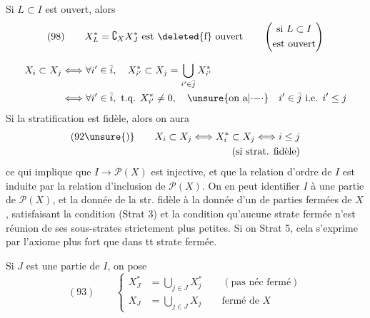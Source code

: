Si  $L\subset I$ est ouvert,  alors
\[
(98)\qquad X_L^*=\complement_X X_J^*\text{ est }\text{\deleted{f}}\text{ ouvert}\qquad\left(\begin{gathered}\text{si }L\subset I\\\text{est ouvert}\end{gathered}\right)
\]


\[
\begin{aligned}
X_i\subset X_j&\Longleftrightarrow\forall i'\in\bar i,\quad X_{i'}^*\subset X_j=\bigcup_{i'\in\bar j}X_{i'}^*\\
&\Longleftrightarrow\forall i'\in\bar i,\text{ t.q. }X_{i'}^*\neq0,\quad\unsure{\text{on a}|\mathord{\cdot}\mathord{-}\mathord{\cdot}}\quad i'\in\bar j\text{ i.e. }i'\leq j
\end{aligned}
\]
Si la stratification est fidèle, alors on aura 
\[
\begin{aligned}
(92\unsure{)}\qquad X_i\subset X_j\Longleftrightarrow X_i^*\subset X_j\Longleftrightarrow i\leq j&\\
(\text{si strat. fidèle})&
\end{aligned}
\]
ce qui implique que $I\longrightarrow\mathcal P(X)$ est injective, et que la relation d'ordre de $I$ est induite par la relation d'inclusion de $\mathcal P(X)$. On en peut identifier $I$ à une partie de $\mathcal P(X)$, et la donnée de la str. fidèle à la donnée d'un   de parties fermées  de $X$,  satisfaisant la condition (Strat 3)  et la condition qu'aucune strate fermée n'est réunion de ses sous-strates strictement plus petites. Si on  Strat 5, cela s'exprime par l'axiome plus fort que dans tt strate fermée.

Si $J$ est une partie de $I$, on pose
\[
(93)\qquad\left\{
\begin{aligned}
X_J^*&=\bigcup_{j\in J}X_j^*\qquad(\text{pas néc fermé})\\
X_J&=\bigcup_{j\in J}X_j\qquad\text{fermé de }X
\end{aligned}\right.
\]

